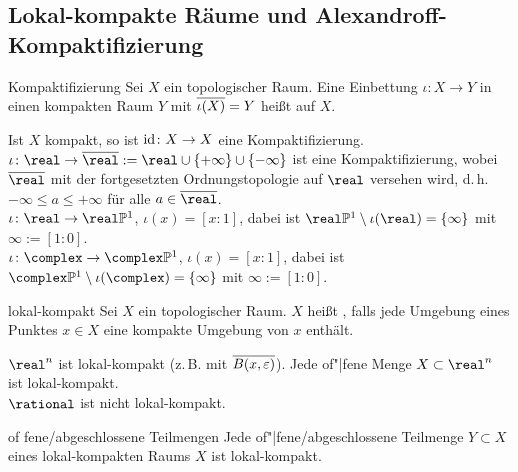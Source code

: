 \pagebreak

\subsection{%
    Lokal-kompakte Räume und Alexandroff-Kompaktifizierung%
}

\begin{Def}{Kompaktifizierung}
    Sei $X$ ein topologischer Raum.
    Eine Einbettung $\iota\colon X \rightarrow Y$ in einen kompakten
    Raum $Y$ mit $\overline{\iota(X)} = Y$
    heißt  auf $X$.
\end{Def}

\begin{Bsp}
    Ist $X$ kompakt, so ist $\operatorname{id}\colon X \rightarrow X$ eine
    Kompaktifizierung. \\
    $\iota\colon \real \rightarrow \overline{\real} :=
    \real \cup \{+\infty\} \cup \{-\infty\}$ ist eine Kompaktifizierung, wobei
    $\overline{\real}$ mit der fortgesetzten Ordnungstopologie auf $\real$
    versehen wird, d.\,h. $-\infty \le a \le +\infty$ für alle
    $a \in \overline{\real}$. \\
    $\iota\colon \real \rightarrow \real\projective^1$, $\iota(x) = [x:1]$,
    dabei ist $\real\projective^1 \setminus \iota(\real) = \{\infty\}$ mit
    $\infty := [1:0]$. \\
    $\iota\colon \complex \rightarrow \complex\projective^1$,
    $\iota(x) = [x:1]$,
    dabei ist $\complex\projective^1 \setminus \iota(\complex) = \{\infty\}$
    mit $\infty := [1:0]$.
\end{Bsp}

\linie

\begin{Def}{lokal-kompakt}
    Sei $X$ ein topologischer Raum.
    $X$ heißt , falls jede Umgebung eines Punktes
    $x \in X$ eine kompakte Umgebung von $x$ enthält.
\end{Def}

\begin{Bsp}
    $\real^n$ ist lokal-kompakt (z.\,B. mit
    $\overline{B(x, \varepsilon)}$).
    Jede of"|fene Menge $X \subset \real^n$ ist lokal-kompakt. \\
    $\rational$ ist nicht lokal-kompakt.
\end{Bsp}

\begin{Satz}{of \!\!fene/abgeschlossene Teilmengen}
    Jede of"|fene/abgeschlossene Teilmenge $Y \subset X$
    eines lokal-kompakten Raums $X$ ist lokal-kompakt.
\end{Satz}

